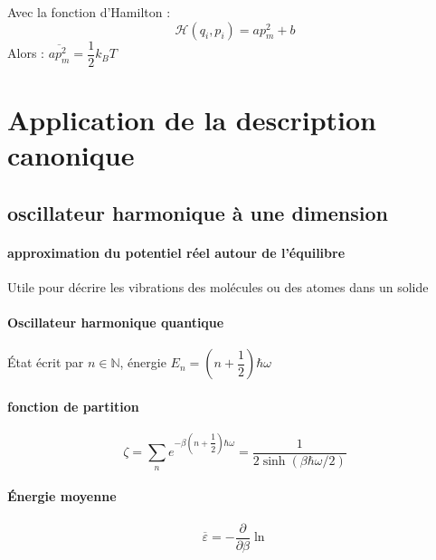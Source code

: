 \documentclass[12pt,a4paper]{report}
\begin{document}
Avec la fonction d'Hamilton :
\[
	\mathcal{H}(q_i, p_i) = ap^2_m + b
\]
Alors : $\overline{ap^2_m} = \dfrac{1}{2} k_B T $

\chapter{Application de la description canonique}

\section{oscillateur harmonique à une dimension}

\subsubsection{approximation du potentiel réel autour de l'équilibre}

Utile pour décrire les vibrations des molécules ou des atomes dans un solide

\subsubsection{Oscillateur harmonique quantique}

État écrit par $n \in \mathbb{N}$, énergie $ E_n = \left ( n + \dfrac{1}{2} \right ) \hbar \omega $

\subsubsection{fonction de partition}

\[
	\zeta = \sum_n e^{-\beta \left ( n + \dfrac{1}{2} \right ) \hbar \omega } = \dfrac{1}{2 \sinh \left ( \beta \hbar \omega / 2 \right )}
\]

\subsubsection{Énergie moyenne}

\[
	\overline{\varepsilon} = -\dfrac{\partial}{\partial \beta} \ln 
\]
\end{document}
